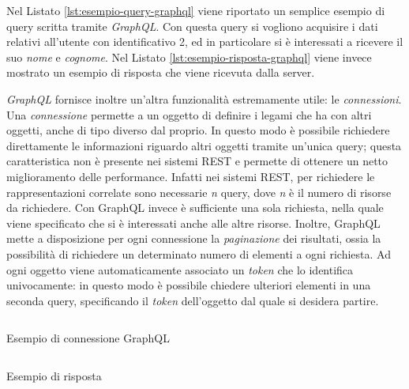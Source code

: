 Nel Listato \ref{lst:esempio-query-graphql} viene riportato un semplice esempio di query scritta tramite \emph{GraphQL}. Con questa query si vogliono acquisire i dati relativi all'utente con identificativo 2, ed in particolare si è interessati a ricevere il suo \emph{nome} e \emph{cognome}. Nel Listato \ref{lst:esempio-risposta-graphql} viene invece mostrato un esempio di risposta che viene ricevuta dalla server.

\emph{GraphQL} fornisce inoltre un'altra funzionalità estremamente utile: le \emph{connessioni}. Una \emph{connessione} permette a un oggetto di definire i legami che ha con altri oggetti, anche di tipo diverso dal proprio. In questo modo è possibile richiedere direttamente le informazioni riguardo altri oggetti tramite un'unica query; questa caratteristica non è presente nei sistemi REST e permette di ottenere un netto miglioramento delle performance. Infatti nei sistemi REST, per richiedere le rappresentazioni correlate sono necessarie \emph{n} query, dove \emph{n} è il numero di risorse da richiedere. Con GraphQL invece è sufficiente una sola richiesta, nella quale viene specificato che si è interessati anche alle altre risorse. Inoltre, GraphQL mette a disposizione per ogni connessione la \emph{paginazione} dei risultati, ossia la possibilità di richiedere un determinato numero di elementi a ogni richiesta. Ad ogni oggetto viene automaticamente associato un \emph{token} che lo identifica univocamente: in questo modo è possibile chiedere ulteriori elementi in una seconda query, specificando il \emph{token} dell'oggetto dal quale si desidera partire.

\begin{center}
	\hspace*{-1.5cm}
	\begin{minipage}[t]{0.63\textwidth}
		\begin{listing}[H]
			\inputminted{text}{2-nozioni-preliminari/Codice/esempio_connessione_graphql.graphql}
			\caption{Esempio di connessione GraphQL}
			\label{lst:esempio-connessione-graphql}
		\end{listing}
	\end{minipage}%
	\begin{minipage}[t]{0.63\textwidth}
		\begin{listing}[H]
			\inputminted{json}{2-nozioni-preliminari/Codice/esempio_risposta_connessione_graphql.json}
			\caption{Esempio di risposta}
			\label{lst:esempio-risposta-connessione-graphql}
		\end{listing}
	\end{minipage}	
\end{center}

